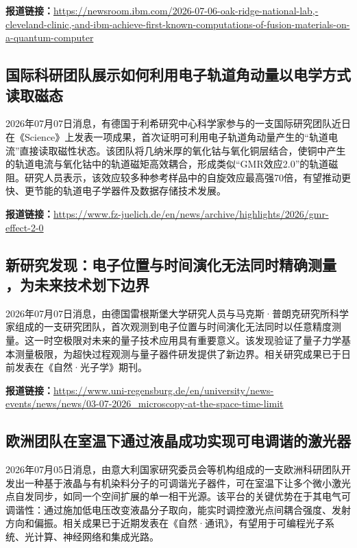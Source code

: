 \documentclass[12pt,a4paper]{ctexart}
\begin{document}
\noindent\textbf{报道链接：}\url{https://newsroom.ibm.com/2026-07-06-oak-ridge-national-lab,-cleveland-clinic,-and-ibm-achieve-first-known-computations-of-fusion-materials-on-a-quantum-computer}

\subsection{ 国际科研团队展示如何利用电子轨道角动量以电学方式读取磁态 }

2026年07月07日消息，有德国于利希研究中心科学家参与的一支国际研究团队近日在《Science》上发表一项成果，首次证明可利用电子轨道角动量产生的“轨道电流”直接读取磁性状态。该团队将几纳米厚的氧化钴与氧化铜层结合，使铜中产生的轨道电流与氧化钴中的轨道磁矩高效耦合，形成类似“GMR效应2.0”的轨道磁阻。研究人员表示，该效应较多种参考样品中的自旋效应最高强70倍，有望推动更快、更节能的轨道电子学器件及数据存储技术发展。

\noindent\textbf{报道链接：}\url{https://www.fz-juelich.de/en/news/archive/highlights/2026/gmr-effect-2-0}

\subsection{ 新研究发现：电子位置与时间演化无法同时精确测量 ，为未来技术划下边界 }

2026年07月07日消息，由德国雷根斯堡大学研究人员与马克斯·普朗克研究所科学家组成的一支研究团队，首次观测到电子位置与时间演化无法同时以任意精度测量。这一时空极限对未来的量子技术应用具有重要意义。该发现验证了量子力学基本测量极限，为超快过程观测与量子器件研发提供了新边界。相关研究成果已于日前发表在《自然·光子学》期刊。

\noindent\textbf{报道链接：}\url{https://www.uni-regensburg.de/en/university/news-events/news/news/03-07-2026\_microscopy-at-the-space-time-limit}

\subsection{ 欧洲团队在室温下通过液晶成功实现可电调谐的激光器 }

2026年07月05日消息，由意大利国家研究委员会等机构组成的一支欧洲科研团队开发出一种基于液晶与有机染料分子的可调谐光子器件，可在室温下让多个微小激光点自发同步，如同一个空间扩展的单一相干光源。该平台的关键优势在于其电气可调谐性：通过施加低电压改变液晶分子取向，能实时调控激光点间耦合强度、发射方向和偏振。相关成果已于近期发表在《自然·通讯》，有望用于可编程光子系统、光计算、神经网络和集成光路。
\end{document}
